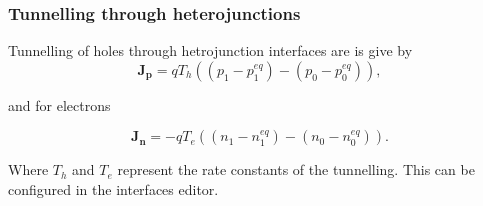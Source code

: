 \subsubsection{Tunnelling through heterojunctions}
Tunnelling of holes through hetrojunction interfaces are is give by
\begin{equation}
\boldsymbol{J_p} = q T_{h}  ((p_{1}-p_{1}^{eq})-(p_{0}-p_{0}^{eq})),
\end{equation}

and for electrons

\begin{equation}
\boldsymbol{J_n} = -q T_{e}  ((n_{1}-n_{1}^{eq})-(n_{0}-n_{0}^{eq})).
\end{equation}

Where $T_{h}$ and $T_{e}$ represent the rate constants of the tunnelling. This can be configured in the interfaces editor.
